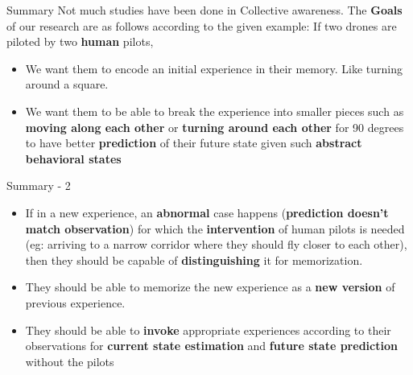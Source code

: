 \documentclass[unknownkeysallowed]{beamer}
\begin{document}
\begin{frame}{Summary}
	Not much studies have been done in Collective awareness. The \textbf{Goals} of our research are as follows according to the given example: If two drones are piloted by two \textbf{human} pilots,
	\begin{itemize}
		\item We want them to encode an initial experience in their memory. Like turning around a square. 
		\item We want them to be able to break the experience into smaller pieces such as \textbf{moving along each other} or \textbf{turning around each other} for 90 degrees to have better \textbf{prediction} of their future state given such \textbf{abstract behavioral states}
	\end{itemize}
\end{frame}

\begin{frame}{Summary - 2}
	\begin{itemize}
		\item If in a new experience, an \textbf{abnormal} case happens (\textbf{prediction doesn't match observation}) for which the \textbf{intervention} of human pilots is needed (eg: arriving to a narrow corridor where they should fly closer to each other), then they should be capable of \textbf{distinguishing} it for memorization. 
		\item They should be able to memorize the new experience as a\textbf{ new version} of previous experience. 
		\item They should be able to \textbf{invoke} appropriate experiences according to their observations for \textbf{current state estimation} and \textbf{future state prediction} without the pilots
	\end{itemize}
\end{frame}
\end{document}
